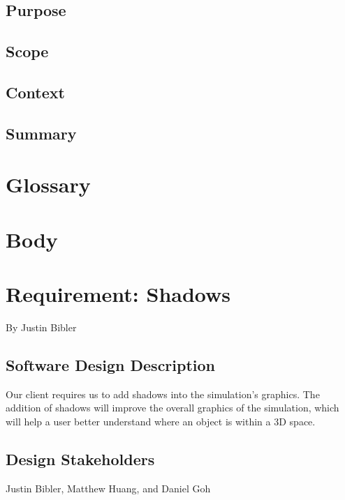 \documentclass[10pt,journal,compsoc,draftclsnofoot]{IEEEtran}
\begin{document}
\begin{flushleft}

\subsection{Purpose}

\subsection{Scope}

\subsection{Context}

\subsection{Summary}

\newpage




\section{Glossary}

\newpage

\section{Body}

\newpage

\section{Requirement: Shadows}
\large{By Justin Bibler}


\normalsize
\subsection{Software Design Description}
Our client requires us to add shadows into the simulation's graphics.
The addition of shadows will improve the overall graphics of the simulation, which will help a user better understand where an object is within a 3D space.

\subsection{Design Stakeholders}
Justin Bibler, Matthew Huang, and Daniel Goh


\end{flushleft}
\end{document}
